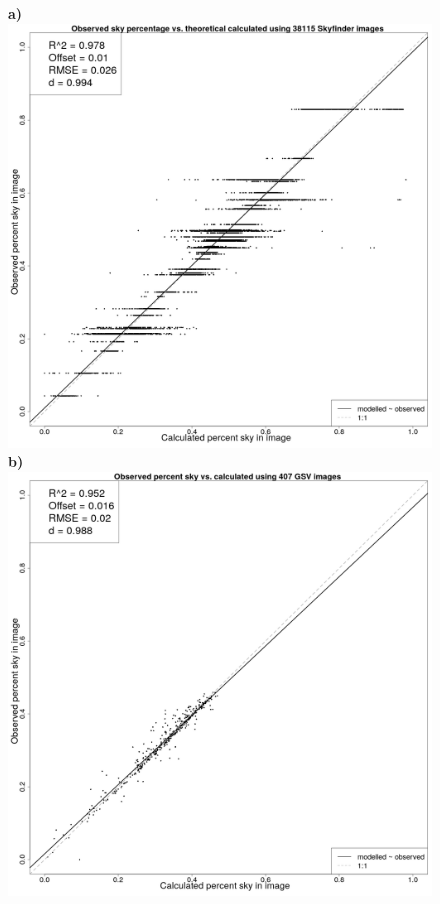 \documentclass[final,3p,times,authoryear]{elsarticle}
\begin{document}
\begin{figure}
\centering
\textbf{a)}\includegraphics[scale=0.15]{Images/ErrorPlots.png}
\textbf{b)}\includegraphics[scale=0.15]{Images/ErrorPlots2.png}

\end{figure}
\end{document}
